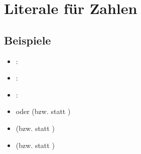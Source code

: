 \section{Literale für Zahlen}

\subsection*{Beispiele}

\begin{itemize}
    \item {}: 
    \item {}: 
    \item {}: 
    \item {}  oder  (bzw.  statt )
    \item {}  (bzw.  statt )
    \item {}  (bzw.  statt )
\end{itemize}


